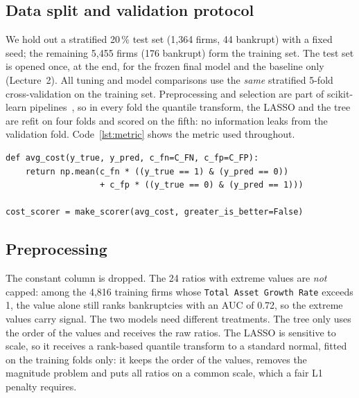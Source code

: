 \documentclass[11pt,a4paper]{article}
\begin{document}
\subsection{Data split and validation protocol}
We hold out a stratified 20\,\% test set (1,364 firms, 44 bankrupt) with a fixed seed; the remaining 5,455 firms (176 bankrupt) form the training set. The test set is opened once, at the end, for the frozen final model and the baseline only (Lecture~2). All tuning and model comparisons use the \emph{same} stratified 5-fold cross-validation on the training set. Preprocessing and selection are part of scikit-learn pipelines~\cite{sklearn}, so in every fold the quantile transform, the LASSO and the tree are refit on four folds and scored on the fifth: no information leaks from the validation fold. Code~\ref{lst:metric} shows the metric used throughout.

\begin{lstlisting}[float=htbp, caption={The decision cost as a scikit-learn scorer (notebook, Section 3.1).}, label={lst:metric}]
def avg_cost(y_true, y_pred, c_fn=C_FN, c_fp=C_FP):
    return np.mean(c_fn * ((y_true == 1) & (y_pred == 0))
                   + c_fp * ((y_true == 0) & (y_pred == 1)))

cost_scorer = make_scorer(avg_cost, greater_is_better=False)
\end{lstlisting}

\subsection{Preprocessing}\label{sec:preproc}
The constant column is dropped. The 24 ratios with extreme values are \emph{not} capped: among the 4,816 training firms whose \texttt{Total Asset Growth Rate} exceeds 1, the value alone still ranks bankruptcies with an AUC of 0.72, so the extreme values carry signal. The two models need different treatments. The tree only uses the order of the values and receives the raw ratios. The LASSO is sensitive to scale, so it receives a rank-based quantile transform to a standard normal, fitted on the training folds only: it keeps the order of the values, removes the magnitude problem and puts all ratios on a common scale, which a fair L1 penalty requires.
\end{document}
